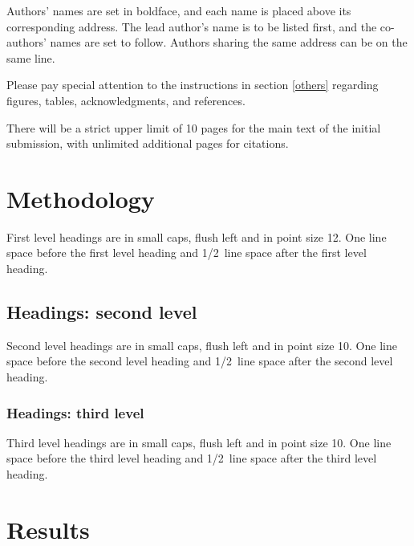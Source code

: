 \documentclass{article} %
\begin{document}
Authors' names are
set in boldface, and each name is placed above its corresponding
address. The lead author's name is to be listed first, and
the co-authors' names are set to follow. Authors sharing the
same address can be on the same line.

Please pay special attention to the instructions in section \ref{others}
regarding figures, tables, acknowledgments, and references.


There will be a strict upper limit of 10 pages for the main text of the initial submission, with unlimited additional pages for citations. 

\section{Methodology}
\label{headings}

First level headings are in small caps,
flush left and in point size 12. One line space before the first level
heading and 1/2~line space after the first level heading.

\subsection{Headings: second level}

Second level headings are in small caps,
flush left and in point size 10. One line space before the second level
heading and 1/2~line space after the second level heading.

\subsubsection{Headings: third level}

Third level headings are in small caps,
flush left and in point size 10. One line space before the third level
heading and 1/2~line space after the third level heading.


\section{Results}
\end{document}
